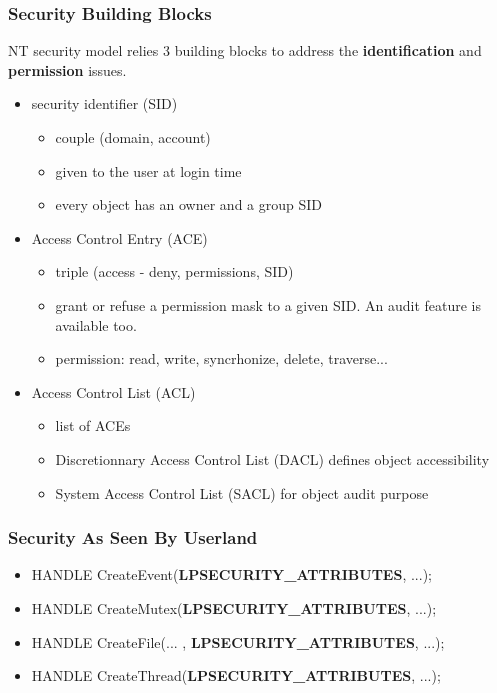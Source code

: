 
\begin{frame}
  \frametitle{Security Building Blocks}

  NT security model relies 3 building blocks to address the
  \textbf{identification} and \textbf{permission} issues.

  \begin{itemize}

    \item
      security identifier (SID)
      \begin{itemize}
      \item
        couple (domain, account)
      \item
        given to the user at login time
      \item
        every object has an owner and a group SID
      \end{itemize}

    \item
      Access Control Entry (ACE)
      \begin{itemize}
        \item
          triple (access - deny, permissions, SID)
        \item
          grant or refuse a permission mask to a given SID. An audit feature is available too.
        \item
          permission: read, write, syncrhonize, delete, traverse...
      \end{itemize}

    \item
      Access Control List (ACL)
      \begin{itemize}
        \item
          list of ACEs
        \item
          Discretionnary Access Control List (DACL) defines object accessibility
        \item
          System Access Control List (SACL) for object audit purpose
      \end{itemize}

  \end{itemize}

\end{frame}


\begin{frame}[containsverbatim]
  \frametitle{Security As Seen By Userland}

  \begin{itemize}
    \item
      HANDLE CreateEvent(\textbf{LPSECURITY\_ATTRIBUTES}, ...);
    \item
      HANDLE CreateMutex(\textbf{LPSECURITY\_ATTRIBUTES}, ...);
    \item
      HANDLE CreateFile(... , \textbf{LPSECURITY\_ATTRIBUTES}, ...);
    \item
      HANDLE CreateThread(\textbf{LPSECURITY\_ATTRIBUTES}, ...);
  \end{itemize}

\end{frame}

